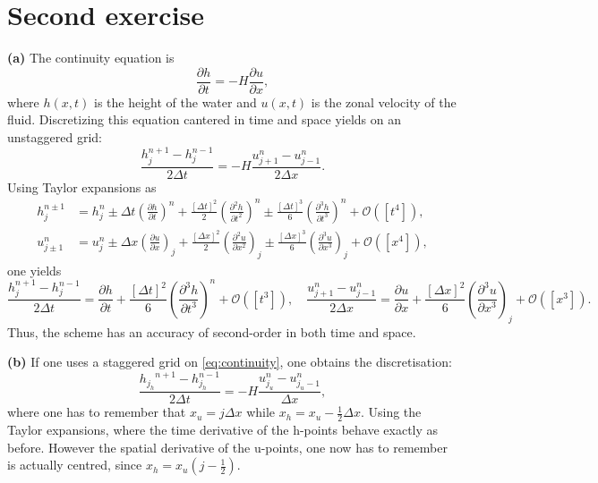 \newpage
\section{Second exercise}

\textbf{(a)} The continuity equation is 
\begin{equation}
    \frac{\partial h}{\partial t} = -H \frac{\partial u}{\partial x}, 
    \label{eq:continuity}
\end{equation}
where $h(x,t)$ is the height of the water and $u(x,t)$ is the zonal velocity of the fluid. Discretizing this equation cantered in time and space yields on an unstaggered grid: 
\begin{equation}
    \frac{h_j^{n+1} - h_j^{n-1}}{2\Delta t}
= -H \frac{u_{j+1}^n - u_{j-1}^n}{2\Delta x}.
\end{equation}
Using Taylor expansions as 
\begin{align}
h_j^{n\pm1} &= h_j^n \pm \Delta t \left(\frac{\partial h}{\partial t}\right)^n 
+ \frac{\left[\Delta t\right]^2}{2} \left(\frac{\partial^2 h}{\partial t^2}\right)^n 
\pm \frac{\left[\Delta t\right]^3}{6} \left(\frac{\partial^3 h}{\partial t^3}\right)^n + \mathcal{O}(\left[t^4\right]), \\
u_{j\pm1}^{n} &= u_j^n \pm \Delta x \left(\frac{\partial u}{\partial x}\right)_j 
+ \frac{\left[\Delta x\right]^2}{2} \left(\frac{\partial^2 u}{\partial x^2}\right)_j 
\pm \frac{\left[\Delta x\right]^3}{6} \left(\frac{\partial^3 u}{\partial x^3}\right)_j + \mathcal{O}(\left[x^4\right]),
\end{align}
one yields 
\begin{equation}
    \frac{h_j^{n+1} - h_j^{n-1}}{2\Delta t}
= \frac{\partial h}{\partial t} + \frac{\left[\Delta t\right]^2}{6} \left(\frac{\partial^3h}{\partial t^3}\right)^n+ \mathcal{O}(\left[t^3\right]),
\quad
\frac{u_{j+1}^n - u_{j-1}^n}{2\Delta x}
= \frac{\partial u}{\partial x} + \frac{\left[\Delta x\right]^2}{6} \left(\frac{\partial^3u}{\partial x^3}\right)_j + \mathcal{O}(\left[x^3\right]).
\end{equation}
Thus, the scheme has an accuracy of second-order in both time and space.

\textbf{(b)} If one uses a staggered grid on \autoref{eq:continuity}, one obtains the discretisation:
\begin{equation}
    \frac{{h_{j_h}}^{n+1} - h_{j_h}^{n-1}}{2\Delta t}
    = -H \frac{u_{j_u}^n - u_{j_u-1}^n}{\Delta x},
\end{equation}
where one has to remember that $x_u = j\Delta x$ while $x_h = x_u - \frac{1}{2}\Delta x$. Using the Taylor expansions, where the time derivative of the h-points behave exactly as before. However the spatial derivative of the u-points, one now has to remember is actually centred, since $x_h=x_u(j-\tfrac{1}{2})$. 

